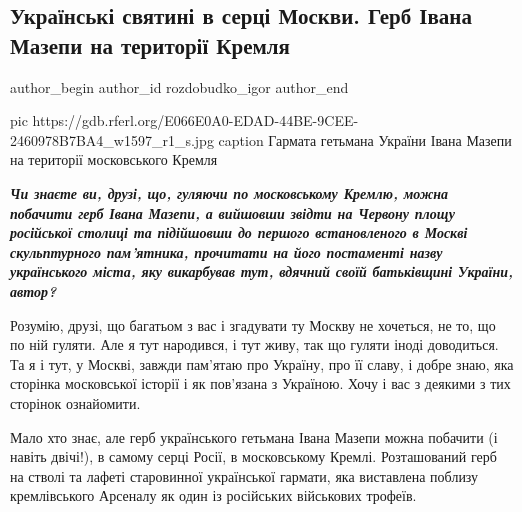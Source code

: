  
 
 
 
 
 
\subsection{Українські святині в серці Москви. Герб Івана Мазепи на території Кремля}
\label{sec:28_12_2020.news.radiosvoboda.rozdobudko_igor.1.moskva_ukraina_gerb_mazepy_kreml}
\ifcmt
	author_begin
   author_id rozdobudko_igor
	author_end
\fi

\ifcmt
  pic https://gdb.rferl.org/E066E0A0-EDAD-44BE-9CEE-2460978B7BA4_w1597_r1_s.jpg
	caption Гармата гетьмана України Івана Мазепи на території московського Кремля
\fi

\begin{leftbar}
  \begingroup
    \em\Large\bfseries\color{blue}
Чи знаєте ви, друзі, що, гуляючи по московському Кремлю, можна побачити герб
Івана Мазепи, а вийшовши звідти на Червону площу російської столиці та
підійшовши до першого встановленого в Москві скульптурного пам'ятника,
прочитати на його постаменті назву українського міста, яку викарбував тут,
вдячний своїй батьківщині України, автор?
  \endgroup
\end{leftbar}

Розумію, друзі, що багатьом з вас і згадувати ту Москву не хочеться, не то, що
по ній гуляти. Але я тут народився, і тут живу, так що гуляти іноді доводиться.
Та я і тут, у Москві, завжди пам'ятаю про Україну, про її славу, і добре знаю,
яка сторінка московської історії і як пов'язана з Україною. Хочу і вас з
деякими з тих сторінок ознайомити.

Мало хто знає, але герб українського гетьмана Івана Мазепи можна побачити (і
навіть двічі!), в самому серці Росії, в московському Кремлі. Розташований герб
на стволі та лафеті старовинної української гармати, яка виставлена поблизу
кремлівського Арсеналу як один із російських військових трофеїв.

